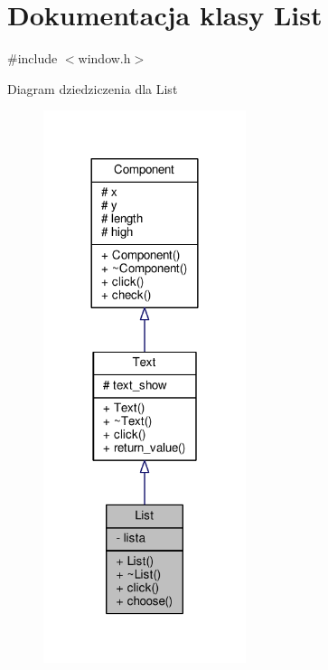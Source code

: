 \hypertarget{classList}{}\section{Dokumentacja klasy List}
\label{classList}


{\ttfamily \#include $<$window.\+h$>$}



Diagram dziedziczenia dla List
\nopagebreak
\begin{figure}[H]
\begin{center}
\leavevmode
\includegraphics[width=168pt]{classList__inherit__graph}
\end{center}
\end{figure}


